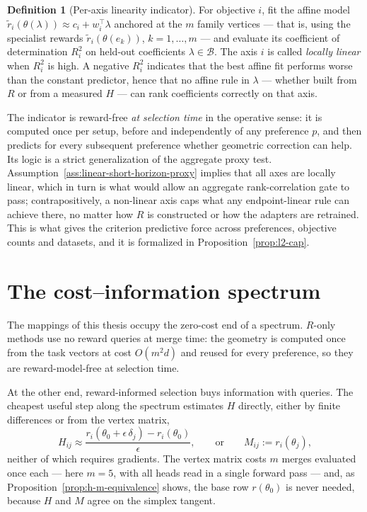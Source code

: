 \documentclass[12pt,a4paper]{report}
\newcommand{\1}{\mathbf{1}}
\newcommand{\Bset}{\mathcal{B}}
\theoremstyle{definition}
\newtheorem{definition}{Definition}
\begin{document}
\begin{definition}[Per-axis linearity indicator]
\label{def:linearity-indicator}
For objective \(i\), fit the affine model \(\tilde r_i(\theta(\lambda))\approx c_i+w_i^\top\lambda\) anchored at the \(m\) family vertices --- that is, using the specialist rewards \(\tilde r_i(\theta(e_k))\), \(k=1,\dots,m\) --- and evaluate its coefficient of determination \(R^2_i\) on held-out coefficients \(\lambda\in\Bset\). The axis \(i\) is called \emph{locally linear} when \(R^2_i\) is high. A negative \(R^2_i\) indicates that the best affine fit performs worse than the constant predictor, hence that no affine rule in \(\lambda\) --- whether built from \(R\) or from a measured \(H\) --- can rank coefficients correctly on that axis.
\end{definition}

The indicator is reward-free \emph{at selection time} in the operative sense: it is computed once per setup, before and independently of any preference \(p\), and then predicts for every subsequent preference whether geometric correction can help. Its logic is a strict generalization of the aggregate proxy test. Assumption~\ref{ass:linear-short-horizon-proxy} implies that all axes are locally linear, which in turn is what would allow an aggregate rank-correlation gate to pass; contrapositively, a non-linear axis caps what any endpoint-linear rule can achieve there, no matter how \(R\) is constructed or how the adapters are retrained. This is what gives the criterion predictive force across preferences, objective counts and datasets, and it is formalized in Proposition~\ref{prop:l2-cap}.

\section{The cost--information spectrum}
\label{sec:cost-information}

The mappings of this thesis occupy the zero-cost end of a spectrum. \(R\)-only methods use no reward queries at merge time: the geometry is computed once from the task vectors at cost \(O(m^2 d)\) and reused for every preference, so they are reward-model-free at selection time.

At the other end, reward-informed selection buys information with queries. The cheapest useful step along the spectrum estimates \(H\) directly, either by finite differences or from the vertex matrix,
\[
H_{ij}\approx\frac{r_i(\theta_0+\epsilon\,\delta_j)-r_i(\theta_0)}{\epsilon},
\qquad\text{or}\qquad
M_{ij}:=r_i(\theta_j),
\]
neither of which requires gradients. The vertex matrix costs \(m\) merges evaluated once each --- here \(m=5\), with all heads read in a single forward pass --- and, as Proposition~\ref{prop:h-m-equivalence} shows, the base row \(r(\theta_0)\) is never needed, because \(H\) and \(M\) agree on the simplex tangent.
\end{document}
